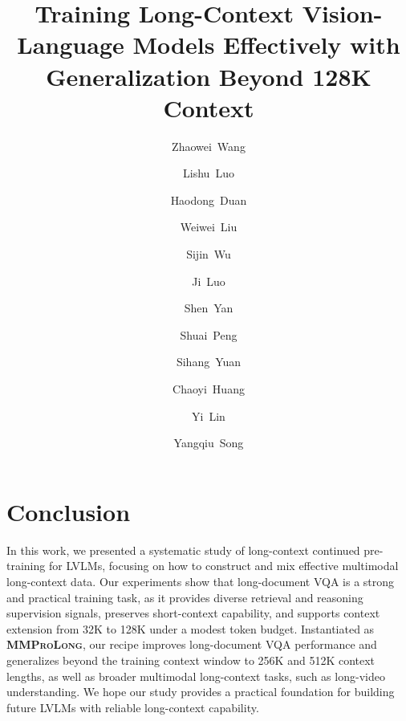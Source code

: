 \documentclass[]{bytedance_seed}
\title{Training Long-Context Vision-Language Models Effectively with Generalization Beyond 128K Context}
\author[1,2, *]{Zhaowei~Wang}
\author[2]{Lishu~Luo}
\author[2]{Haodong~Duan}
\author[2]{Weiwei~Liu}
\author[2]{Sijin~Wu}
\author[2]{Ji~Luo}
\author[2]{Shen~Yan}
\author[2]{Shuai~Peng}
\author[2]{Sihang~Yuan}
\author[2]{Chaoyi~Huang}
\author[2, \dagger]{Yi~Lin}
\author[1, \dagger]{Yangqiu~Song}
\affiliation[1]{CSE Department, HKUST}
\affiliation[2]{ByteDance Seed}
\newcommand{\modelname}{\textsc{\textbf{MMProLong}}\xspace}
\begin{document}
\maketitle









\section{Conclusion}
In this work, we presented a systematic study of long-context continued pre-training for LVLMs, focusing on how to construct and mix effective multimodal long-context data.
Our experiments show that long-document VQA is a strong and practical training task, as it provides diverse retrieval and reasoning supervision signals, preserves short-context capability, and supports context extension from 32K to 128K under a modest token budget.
Instantiated as \modelname, our recipe improves long-document VQA performance and generalizes beyond the training context window to 256K and 512K context lengths, as well as broader multimodal long-context tasks, such as long-video understanding.
We hope our study provides a practical foundation for building future LVLMs with reliable long-context capability.
\clearpage

\clearpage




\clearpage
\beginappendix
{}

\end{document}
